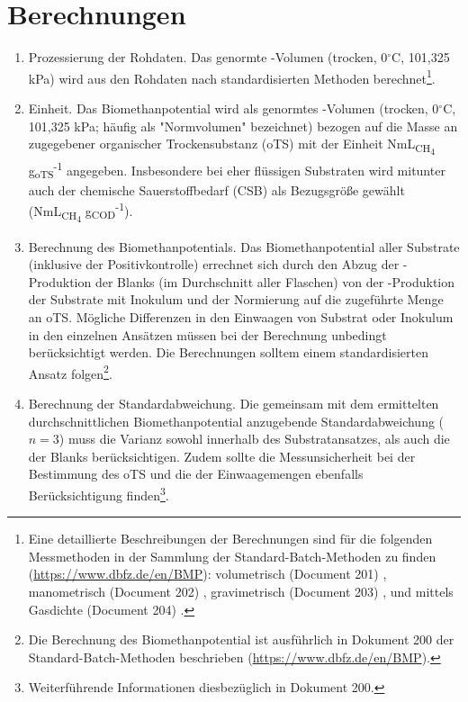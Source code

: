 \documentclass[]{article}
\begin{document}
\section{Berechnungen}
\label{sec:calculations}
\begin{enumerate}
  \item Prozessierung der Rohdaten.
    Das genormte -Volumen (trocken, 0$^\circ$C, 101,325 kPa) wird aus den Rohdaten nach standardisierten Methoden berechnet\footnote{
      Eine detaillierte Beschreibungen der Berechnungen sind für die folgenden Messmethoden in der Sammlung der Standard-Batch-Methoden zu finden (\url{https://www.dbfz.de/en/BMP}): volumetrisch (Document 201) \citep{BMPdoc201vol}, manometrisch (Document 202) \citep{BMPdoc202man}, gravimetrisch (Document 203) \citep{BMPdoc203grav}, und mittels Gasdichte (Document 204) \citep{BMPdoc204gasdens}.
    }.
  \item Einheit.
	  Das Biomethanpotential wird als genormtes -Volumen (trocken, 0$^\circ$C, 101,325 kPa; häufig als "Normvolumen" bezeichnet) bezogen auf die Masse an zugegebener organischer Trockensubstanz (oTS) mit der Einheit NmL\textsubscript{CH\textsubscript{4}} g\textsubscript{oTS}\textsuperscript{-1} angegeben. Insbesondere bei eher flüssigen Substraten wird mitunter auch der chemische Sauerstoffbedarf (CSB) als Bezugsgröße gewählt (NmL\textsubscript{CH\textsubscript{4}} g\textsubscript{COD}\textsuperscript{-1}).
  \item Berechnung des Biomethanpotentials.
    Das Biomethanpotential aller Substrate (inklusive der Positivkontrolle) errechnet sich durch den Abzug der -Produktion der Blanks (im Durchschnitt aller Flaschen) von der -Produktion der Substrate mit Inokulum und der Normierung auf die zugeführte Menge an oTS.
    Mögliche Differenzen in den Einwaagen von Substrat oder Inokulum in den einzelnen Ansätzen müssen bei der Berechnung unbedingt berücksichtigt werden.
    Die Berechnungen solltem einem standardisierten Ansatz folgen\footnote{
      Die Berechnung des Biomethanpotential ist ausführlich in Dokument 200 der Standard-Batch-Methoden beschrieben (\url{https://www.dbfz.de/en/BMP}).
    }.
  \item Berechnung der Standardabweichung.
    Die gemeinsam mit dem ermittelten durchschnittlichen Biomethanpotential anzugebende Standardabweichung ($n = 3$) muss die Varianz sowohl innerhalb des Substratansatzes, als auch die der Blanks berücksichtigen. Zudem sollte die Messunsicherheit bei der Bestimmung des oTS und die der Einwaagemengen ebenfalls Berücksichtigung finden\footnote{
      Weiterführende Informationen diesbezüglich in Dokument 200. 
    }.
\end{enumerate}
\end{document}
